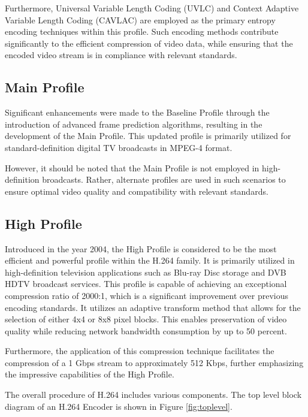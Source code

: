 Furthermore, Universal Variable Length Coding (UVLC) and Context Adaptive Variable Length Coding (CAVLAC) are employed as the primary entropy encoding techniques within this profile. Such encoding methods contribute significantly to the efficient compression of video data, while ensuring that the encoded video stream is in compliance with relevant standards. 

\subsection{Main Profile}
Significant enhancements were made to the Baseline Profile through the introduction of advanced frame prediction algorithms, resulting in the development of the Main Profile. This updated profile is primarily utilized for standard-definition digital TV broadcasts in MPEG-4 format.

However, it should be noted that the Main Profile is not employed in high-definition broadcasts. Rather, alternate profiles are used in such scenarios to ensure optimal video quality and compatibility with relevant standards.

\subsection{High Profile}
Introduced in the year 2004, the High Profile is considered to be the most efficient and powerful profile within the H.264 family. It is primarily utilized in high-definition television applications such as Blu-ray Disc storage and DVB HDTV broadcast services. This profile is capable of achieving an exceptional compression ratio of 2000:1, which is a significant improvement over previous encoding standards. It utilizes an adaptive transform method that allows for the selection of either 4x4 or 8x8 pixel blocks. This enables preservation of video quality while reducing network bandwidth consumption by up to 50 percent.

Furthermore, the application of this compression technique facilitates the compression of a 1 Gbps stream to approximately 512 Kbps, further emphasizing the impressive capabilities of the High Profile.

The overall procedure of H.264 includes various components. The top level block diagram of an H.264 Encoder is shown in Figure \ref{fig:toplevel}.

